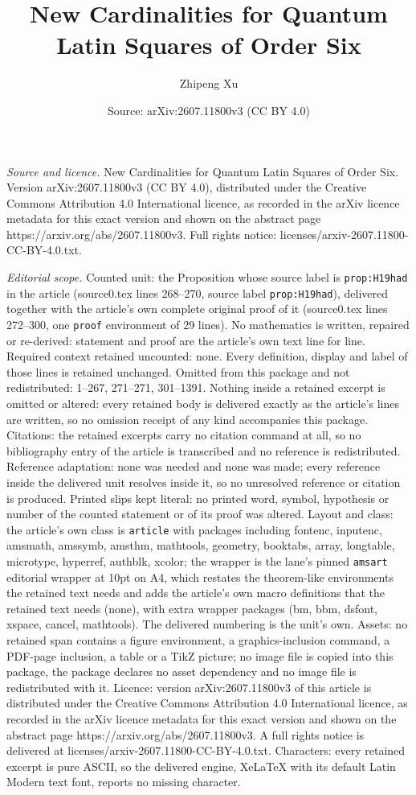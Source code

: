 \documentclass[10pt,a4paper]{amsart}
\title[New Cardinalities for Quantum Latin Squares of Order Six]{New Cardinalities for Quantum Latin Squares of Order Six}
\author{Zhipeng Xu}
\date{Source: arXiv:2607.11800v3 (CC BY 4.0)}
\begin{document}
\maketitle

\noindent\emph{Source and licence.} New Cardinalities for Quantum Latin Squares of Order Six. Version arXiv:2607.11800v3 (CC BY 4.0), distributed under the Creative Commons Attribution 4.0 International licence, as recorded in the arXiv licence metadata for this exact version and shown on the abstract page https://arxiv.org/abs/2607.11800v3. Full rights notice: licenses/arxiv-2607.11800-CC-BY-4.0.txt.\par\smallskip

\noindent\textit{Editorial scope.} Counted unit: the Proposition whose source label is \texttt{prop:H19had} in the article (source0.tex lines 268--270, source label \texttt{prop:H19had}), delivered together with the article's own complete original proof of it (source0.tex lines 272--300, one \texttt{proof} environment of 29 lines). No mathematics is written, repaired or re-derived: statement and proof are the article's own text line for line. Required context retained uncounted: none. Every definition, display and label of those lines is retained unchanged. Omitted from this package and not redistributed: 1--267, 271--271, 301--1391. Nothing inside a retained excerpt is omitted or altered: every retained body is delivered exactly as the article's lines are written, so no omission receipt of any kind accompanies this package. Citations: the retained excerpts carry no citation command at all, so no bibliography entry of the article is transcribed and no reference is redistributed. Reference adaptation: none was needed and none was made; every reference inside the delivered unit resolves inside it, so no unresolved reference or citation is produced. Printed slips kept literal: no printed word, symbol, hypothesis or number of the counted statement or of its proof was altered. Layout and class: the article's own class is \texttt{article} with packages including fontenc, inputenc, amsmath, amssymb, amsthm, mathtools, geometry, booktabs, array, longtable, microtype, hyperref, authblk, xcolor; the wrapper is the lane's pinned \texttt{amsart} editorial wrapper at 10pt on A4, which restates the theorem-like environments the retained text needs and adds the article's own macro definitions that the retained text needs (none), with extra wrapper packages (bm, bbm, dsfont, xspace, cancel, mathtools). The delivered numbering is the unit's own. Assets: no retained span contains a figure environment, a graphics-inclusion command, a PDF-page inclusion, a table or a TikZ picture; no image file is copied into this package, the package declares no asset dependency and no image file is redistributed with it. Licence: version arXiv:2607.11800v3 of this article is distributed under the Creative Commons Attribution 4.0 International licence, as recorded in the arXiv licence metadata for this exact version and shown on the abstract page https://arxiv.org/abs/2607.11800v3. A full rights notice is delivered at licenses/arxiv-2607.11800-CC-BY-4.0.txt. Characters: every retained excerpt is pure ASCII, so the delivered engine, XeLaTeX with its default Latin Modern text font, reports no missing character.
\end{document}
